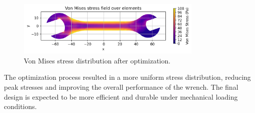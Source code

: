 \begin{figure}[H]
    \centering
    \includegraphics[width=0.8\textwidth]{GRAFICOS/Topo_von_mises.png}
    \caption{Von Mises stress distribution after optimization.}
    \label{fig:von_mises_optimized}
\end{figure}
The optimization process resulted in a more uniform stress distribution, reducing peak stresses and improving the overall performance of the wrench. The final design is expected to be more efficient and durable under mechanical loading conditions.







